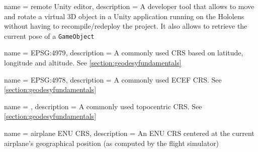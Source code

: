 {
    name = {remote Unity editor},
    description = {
        A developer tool that allows to move and rotate a virtual 3D object in a Unity application running on the Hololens without having to recompile/redeploy the project. It also allows to retrieve the current pose of a \texttt{GameObject}
    }
}

{
    name = {EPSG:4979},
    description = {
        A commonly used \acrlong{CRS} based on latitude, longitude and altitude. See \autoref{section:geodesyfundamentals}
    }
}

{
    name = {EPSG:4978},
    description = {
        A commonly used \acrlong{ECEF} \acrlong{CRS}. See \autoref{section:geodesyfundamentals}
    }
}

{
    name = {},
    description = {
        A commonly used topocentric \acrlong{CRS}. See \autoref{section:geodesyfundamentals}
    }
}

{
    name = {airplane \gls{ENU} \gls{CRS}},
    description = {
        An \acrlong{ENU} \acrlong{CRS} centered at the current airplane's geographical position (as computed by the flight simulator)
    }
}